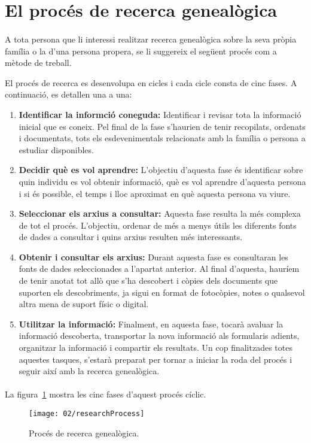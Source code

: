 \section{El procés de recerca genealògica}

    \paragraph{}
    A tota persona que li interessi realitzar recerca genealògica sobre la seva pròpia família o la d'una persona propera, se li suggereix el següent procés com a mètode de treball.

    El procés de recerca es desenvolupa en cicles i cada cicle consta de cinc fases. A continuació, es detallen una a una:

    \begin{enumerate}
        \item \textbf{Identificar la informció coneguda:} Identificar i revisar tota la informació inicial que es coneix. Pel final de la fase s’haurien de tenir recopilats, ordenats i documentats, tots els esdevenimentals relacionats amb la família o persona a estudiar disponibles.
        \item \textbf{Decidir què es vol aprendre:} L’objectiu d’aquesta fase és identificar sobre quin individu es vol obtenir informació, què es vol aprendre d’aquesta persona i si és possible, el temps i lloc aproximat en què aquesta persona va viure.
        \item \textbf{Seleccionar els arxius a consultar:} Aquesta fase resulta la més complexa de tot el procés. L’objectiu, ordenar de més a menys útils les diferents fonts de dades a consultar i quins arxius resulten més interessants.
        \item \textbf{Obtenir i consultar els arxius:} Durant aquesta fase es consultaran les fonts de dades seleccionades a l’apartat anterior. Al final d’aquesta, hauríem de tenir anotat tot allò que s’ha descobert i còpies dels documents que suporten els descobriments, ja sigui en format de fotocòpies, notes o qualsevol altra mena de suport físic o digital.
        \item \textbf{Utilitzar la informació:} Finalment, en aquesta fase, tocarà avaluar la informació descoberta, transportar la nova informació als formularis adients, or\-ga\-nit\-zar la informació i compartir els resultats. Un cop finalitzades totes aquestes tasques, s'estarà preparat per tornar a iniciar la roda del procés i seguir així amb la recerca genealògica.
    \end{enumerate}

    \paragraph{}
    La figura~\ref{fig:researchProcess} mostra les cinc fases d'aquest procés cíclic.

    \begin{figure}[h]
            \texttt{[image: 02/researchProcess]}
            \centering
            \caption{Procés de recerca genealògica.\label{fig:researchProcess}}
    \end{figure}
